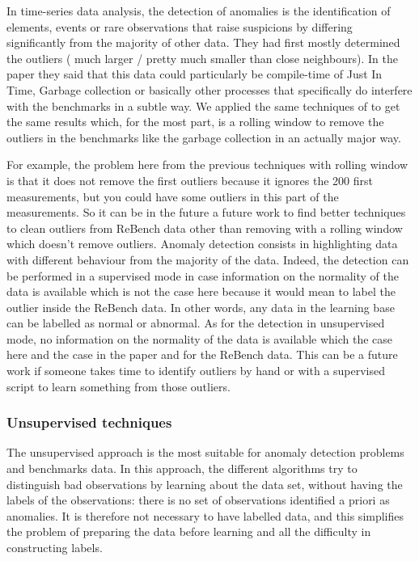 \documentclass[12pt,a4paper]{article}
\begin{document}
In time-series data analysis, the detection of anomalies is the identification of elements, events or rare observations that raise suspicions by differing significantly from the majority of other data. They had first mostly determined the outliers ( much larger / pretty much smaller than close neighbours). In the paper \citep{barrett2017virtual} they said that this data could particularly be compile-time of Just In Time, Garbage collection or basically other processes that specifically do interfere with the benchmarks in a subtle way. We applied the same techniques of \citep{barrett2017virtual} to get the same results which, for the most part, is a rolling window to remove the outliers in the benchmarks like the garbage collection in an actually major way.

For example, the problem here from the previous techniques with rolling window is that it does not remove the first outliers because it ignores the 200 first measurements, but you could have some outliers in this part of the measurements. So it can be in the future a future work to find better techniques to clean outliers from ReBench data other than removing with a rolling window which doesn't remove outliers.
Anomaly detection consists in highlighting data with different behaviour from the majority of the data. 
Indeed, the detection can be performed in a supervised mode in case information on the normality of the data is available which is not the case here because it would mean to label the outlier inside the ReBench data. In other words, any data in the learning base can be labelled as normal or abnormal.
As for the detection in unsupervised mode, no information on the normality of the data is available which the case here and the case in the \citep{barrett2017virtual} paper and for the ReBench data. This can be a future work if someone takes time to identify outliers by hand or with a supervised script to learn something from those outliers.

\subsubsection{Unsupervised techniques}
The unsupervised approach is the most suitable for anomaly detection problems and benchmarks data. In this approach, the different algorithms try to distinguish bad observations by learning about the data set, without having the labels of the observations: there is no set of observations identified a priori as anomalies. It is therefore not necessary to have labelled data, and this simplifies the problem of preparing the data before learning and all the difficulty in constructing labels.
\end{document}

